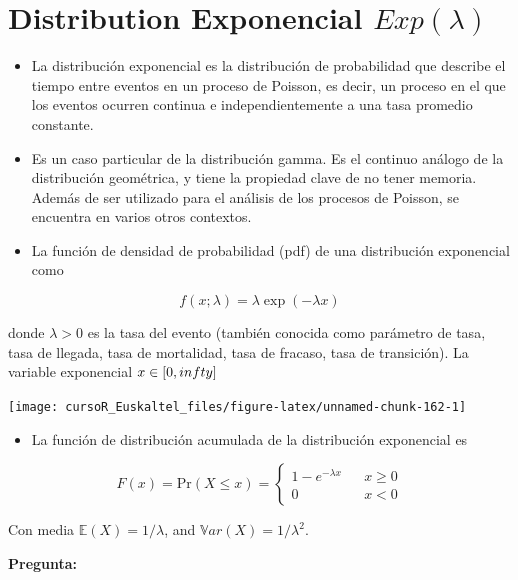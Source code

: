 \documentclass[]{book}
\providecommand{\tightlist}{%
  \setlength{\itemsep}{0pt}\setlength{\parskip}{0pt}}
\begin{document}
\section{\texorpdfstring{Distribution Exponencial
\(Exp(\lambda)\)}{Distribution Exponencial Exp(\textbackslash{}lambda)}}\label{distribution-exponencial-explambda}

\begin{itemize}
\item
  La distribución exponencial es la distribución de probabilidad que
  describe el tiempo entre eventos en un proceso de Poisson, es decir,
  un proceso en el que los eventos ocurren continua e independientemente
  a una tasa promedio constante.
\item
  Es un caso particular de la distribución gamma. Es el continuo análogo
  de la distribución geométrica, y tiene la propiedad clave de no tener
  memoria. Además de ser utilizado para el análisis de los procesos de
  Poisson, se encuentra en varios otros contextos.
\item
  La función de densidad de probabilidad (pdf) de una distribución
  exponencial como
\end{itemize}

\[
f(x;\lambda) =  \lambda \exp(-\lambda x)
\]

donde \(\lambda>0\) es la tasa del evento (también conocida como
parámetro de tasa, tasa de llegada, tasa de mortalidad, tasa de fracaso,
tasa de transición). La variable exponencial \(x \in[0,\\infty]\)

\begin{center}\texttt{[image: cursoR\_Euskaltel\_files/figure-latex/unnamed-chunk-162-1]} \end{center}

\begin{itemize}
\tightlist
\item
  La función de distribución acumulada de la distribución exponencial es
\end{itemize}

\[
F(x) = \mbox{Pr}(X\leq x) = 
  \left\{
    \begin{array}{lcc}
      1- e^{-\lambda x} & & x\geq 0 \\
      0                 & & x < 0
    \end{array}
  \right.
\]

Con media \(\mathbb{E}(X) = 1/\lambda\), and
\(\mathbb{V}ar(X) = 1/\lambda^2\).

\textbf{Pregunta:}
\end{document}
